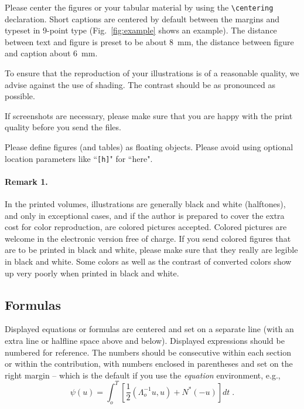\documentclass[runningheads]{llncs}
\begin{document}
Please center the figures or your tabular material by using the \verb+\centering+
declaration. Short captions are centered by default between the margins
and typeset in 9-point type (Fig.~\ref{fig:example} shows an example).
The distance between text and figure is preset to be about 8~mm, the
distance between figure and caption about 6~mm.

To ensure that the reproduction of your illustrations is of a reasonable
quality, we advise against the use of shading. The contrast should be as
pronounced as possible.

If screenshots are necessary, please make sure that you are happy with
the print quality before you send the files.
 

Please define figures (and tables) as floating objects. Please avoid
using optional location parameters like ``\verb+[h]+" for ``here".

\paragraph{Remark 1.}

In the printed volumes, illustrations are generally black and white
(halftones), and only in exceptional cases, and if the author is
prepared to cover the extra cost for color reproduction, are colored
pictures accepted. Colored pictures are welcome in the electronic
version free of charge. If you send colored figures that are to be
printed in black and white, please make sure that they really are
legible in black and white. Some colors as well as the contrast of
converted colors show up very poorly when printed in black and white.

\subsection{Formulas}

Displayed equations or formulas are centered and set on a separate
line (with an extra line or halfline space above and below). Displayed
expressions should be numbered for reference. The numbers should be
consecutive within each section or within the contribution,
with numbers enclosed in parentheses and set on the right margin --
which is the default if you use the \emph{equation} environment, e.g.,
\begin{equation}
  \psi (u) = \int_{o}^{T} \left[\frac{1}{2}
  \left(\Lambda_{o}^{-1} u,u\right) + N^{\ast} (-u)\right] dt \;  .
\end{equation}
\end{document}
